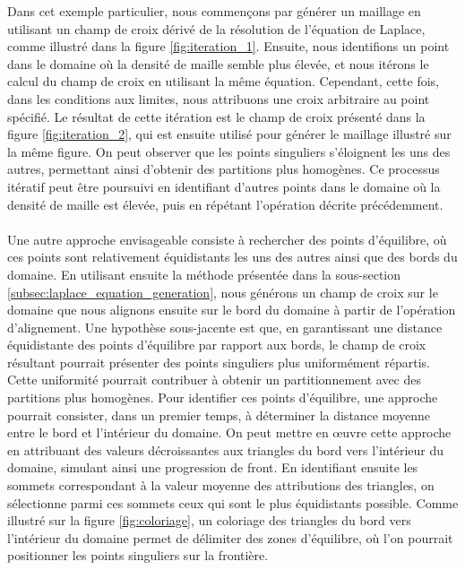 Dans cet exemple particulier, nous commençons par générer un maillage en utilisant un champ de croix dérivé de la résolution de l'équation de Laplace, comme illustré dans la figure \ref{fig:iteration_1}. Ensuite, nous identifions un point dans le domaine où la densité de maille semble plus élevée, et nous itérons le calcul du champ de croix en utilisant la même équation. Cependant, cette fois, dans les conditions aux limites, nous attribuons une croix arbitraire au point spécifié. Le résultat de cette itération est le champ de croix présenté dans la figure \ref{fig:iteration_2}, qui est ensuite utilisé pour générer le maillage illustré sur la même figure. On peut observer que les points singuliers s'éloignent les uns des autres, permettant ainsi d'obtenir des partitions plus homogènes. Ce processus itératif peut être poursuivi en identifiant d'autres points dans le domaine où la densité de maille est élevée, puis en répétant l'opération décrite précédemment.\\\\
Une autre approche envisageable consiste à rechercher des points d'équilibre, où ces points sont relativement équidistants les uns des autres ainsi que des bords du domaine. En utilisant ensuite la méthode présentée dans la sous-section \ref{subsec:laplace_equation_generation}, nous générons un champ de croix sur le domaine que nous alignons ensuite sur le bord du domaine à partir de l'opération d'alignement. Une hypothèse sous-jacente est que, en garantissant une distance équidistante des points d'équilibre par rapport aux bords, le champ de croix résultant pourrait présenter des points singuliers plus uniformément répartis. Cette uniformité pourrait contribuer à obtenir un partitionnement avec des partitions plus homogènes. Pour identifier ces points d'équilibre, une approche pourrait consister, dans un premier temps, à déterminer la distance moyenne entre le bord et l'intérieur du domaine. On peut mettre en œuvre cette approche en attribuant des valeurs décroissantes aux triangles du bord vers l'intérieur du domaine, simulant ainsi une progression de front. En identifiant ensuite les sommets correspondant à la valeur moyenne des attributions des triangles, on sélectionne parmi ces sommets ceux qui sont le plus équidistants possible. Comme illustré sur la figure \ref{fig:coloriage}, un coloriage des triangles du bord vers l'intérieur du domaine permet de délimiter des zones d'équilibre, où l'on pourrait positionner les points singuliers sur la frontière.\\\\

